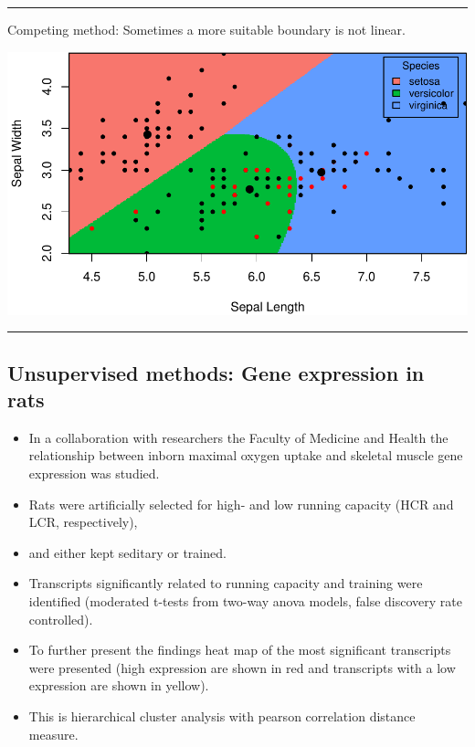 \documentclass[]{article}
\providecommand{\tightlist}{%
  \setlength{\itemsep}{0pt}\setlength{\parskip}{0pt}}
\begin{document}
\begin{center}\rule{0.5\linewidth}{\linethickness}\end{center}

Competing method: Sometimes a more suitable boundary is not linear.

\includegraphics{1Intro_files/figure-latex/irisqda-1.pdf}

\begin{center}\rule{0.5\linewidth}{\linethickness}\end{center}

\hypertarget{unsupervised-methods-gene-expression-in-rats}{%
\subsection{Unsupervised methods: Gene expression in
rats}\label{unsupervised-methods-gene-expression-in-rats}}

\begin{itemize}
\tightlist
\item
  In a collaboration with researchers the Faculty of Medicine and Health
  the relationship between inborn maximal oxygen uptake and skeletal
  muscle gene expression was studied.
\item
  Rats were artificially selected for high- and low running capacity
  (HCR and LCR, respectively),
\item
  and either kept seditary or trained.
\item
  Transcripts significantly related to running capacity and training
  were identified (moderated t-tests from two-way anova models, false
  discovery rate controlled).
\item
  To further present the findings heat map of the most significant
  transcripts were presented (high expression are shown in red and
  transcripts with a low expression are shown in yellow).
\item
  This is hierarchical cluster analysis with pearson correlation
  distance measure.
\end{itemize}
\end{document}
